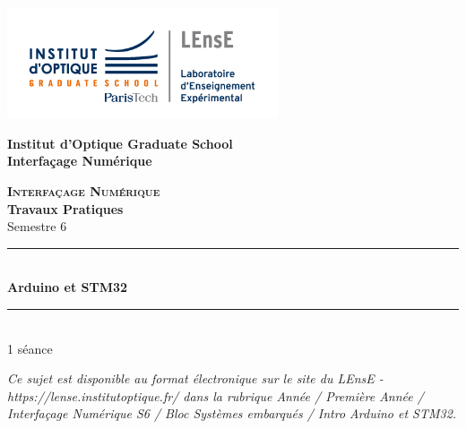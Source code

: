 \documentclass[a4paper,11pt,titlepage]{article} %
\begin{document}
\begin{titlepage}

\begin{center}
	\begin{minipage}{2.5cm}
	\begin{center}
		\includegraphics[width=8cm]{images/Logo-LEnsE.png}
	\end{center}
\end{minipage}\hfill
\begin{minipage}{10cm}
	\begin{center}
	\textbf{Institut d'Optique Graduate School }\\[0.1cm]
    \textbf{Interfaçage Numérique}


	\end{center}
\end{minipage}\hfill


\vspace{4cm}


{\huge \bfseries \textsc{Interfaçage Numérique}} \\[0.5cm]
{\large \bfseries Travaux Pratiques} \\[0.2cm]
Semestre 6

\vspace{2cm}
\rule{\linewidth}{0.3mm} \\[0.4cm]
{ \huge \bfseries\color{violet_iogs} Arduino et STM32 \\[0.4cm] }
\rule{\linewidth}{0.3mm} \\[1cm]

1 séance

\bigskip

\begin{center}
\end{center}

\vfill

\textit{Ce sujet est disponible au format électronique sur le site du LEnsE - https://lense.institutoptique.fr/ dans la rubrique Année / Première Année / Interfaçage Numérique S6 / Bloc Systèmes embarqués / Intro Arduino et STM32.}


\end{center}
\end{titlepage}
\end{document}
